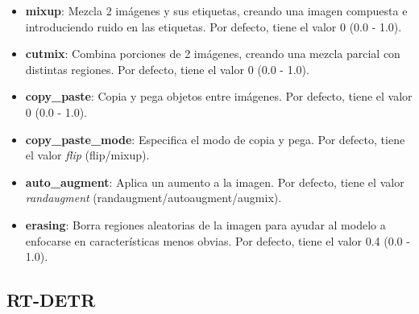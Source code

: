 \documentclass[12pt,a4paper,onecolumn,oneside]{report}
\begin{document}
\begin{itemize}
    \item \textbf{mixup}: Mezcla 2 imágenes y sus etiquetas, creando una imagen compuesta e introduciendo ruido en las etiquetas. Por defecto, tiene el valor 0 (0.0 - 1.0).
    \item \textbf{cutmix}: Combina porciones de 2 imágenes, creando una mezcla parcial con distintas regiones. Por defecto, tiene el valor 0 (0.0 - 1.0). 
    \item \textbf{copy\_paste}: Copia y pega objetos entre imágenes. Por defecto, tiene el valor 0 (0.0 - 1.0). 
    \item \textbf{copy\_paste\_mode}: Especifica el modo de copia y pega. Por defecto, tiene el valor \textit{flip} (flip/mixup).
    \item \textbf{auto\_augment}: Aplica un aumento a la imagen. Por defecto, tiene el valor \textit{randaugment} (randaugment/autoaugment/augmix).
    \item \textbf{erasing}: Borra regiones aleatorias de la imagen para ayudar al modelo a enfocarse en características menos obvias. Por defecto, tiene el valor 0.4 (0.0 - 1.0).
\end{itemize}

\subsection{RT-DETR}
\end{document}
